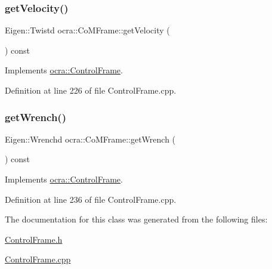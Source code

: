 \subsubsection{\texorpdfstring{get\+Velocity()}{getVelocity()}}
{\footnotesize\ttfamily Eigen\+::\+Twistd ocra\+::\+Co\+M\+Frame\+::get\+Velocity (\begin{DoxyParamCaption}{ }\end{DoxyParamCaption}) const\hspace{0.3cm}{\ttfamily [virtual]}}



Implements \hyperlink{classocra_1_1ControlFrame_a398df839f75886867c86a8e70ac9bf24}{ocra\+::\+Control\+Frame}.



Definition at line 226 of file Control\+Frame.\+cpp.

\hypertarget{classocra_1_1CoMFrame_a8e00462bbe13df6f595b7000d44240c6}{}\label{classocra_1_1CoMFrame_a8e00462bbe13df6f595b7000d44240c6} 
\subsubsection{\texorpdfstring{get\+Wrench()}{getWrench()}}
{\footnotesize\ttfamily Eigen\+::\+Wrenchd ocra\+::\+Co\+M\+Frame\+::get\+Wrench (\begin{DoxyParamCaption}{ }\end{DoxyParamCaption}) const\hspace{0.3cm}{\ttfamily [virtual]}}



Implements \hyperlink{classocra_1_1ControlFrame_a069aaf1eab98598fbffee263fcde0c56}{ocra\+::\+Control\+Frame}.



Definition at line 236 of file Control\+Frame.\+cpp.



The documentation for this class was generated from the following files\+:\begin{DoxyCompactItemize}
\item 
\hyperlink{ControlFrame_8h}{Control\+Frame.\+h}\item 
\hyperlink{ControlFrame_8cpp}{Control\+Frame.\+cpp}\end{DoxyCompactItemize}
